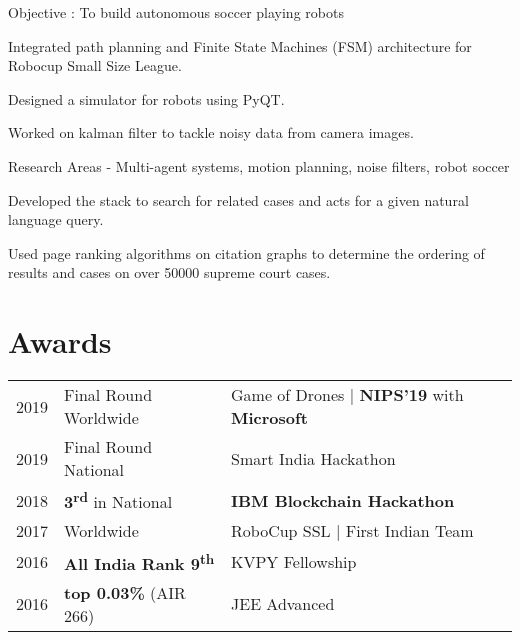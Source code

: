 \documentclass[]{deedy-resume-openfont}
\begin{document}
\begin{minipage}[t]{0.66\textwidth}
Objective : To build autonomous soccer playing robots
\begin{tightemize}
\item Integrated path planning and Finite State Machines (FSM) architecture for Robocup Small Size League.
\item Designed a simulator for robots using PyQT.
\item Worked on kalman filter to tackle noisy data from camera images.
\end{tightemize}
Research Areas - Multi-agent systems, motion planning, noise filters, robot soccer
\sectionsep

\begin{tightemize}
\item Developed the stack to search for related cases and acts for a given natural language query.
\item Used page ranking algorithms on citation graphs to determine the ordering of results
and cases on over 50000 supreme court cases.
\end{tightemize}
\sectionsep


\section{Awards} 
\begin{tabular}{rll}
2019	     & Final Round Worldwide  & Game of Drones | \textbf{NIPS'19} with \textbf{Microsoft}\\
2019	     & Final Round National  & Smart India Hackathon\\
2018	     & \textbf{3\textsuperscript{rd}} in National  & \textbf{IBM Blockchain Hackathon}\\
2017     & Worldwide & RoboCup SSL | First Indian Team  \\
2016     & \textbf{All India Rank 9\textsuperscript{th}}  & KVPY Fellowship\\
2016     & \textbf{top 0.03\%} (AIR 266)  & JEE Advanced \\
\end{tabular}
\sectionsep

\end{minipage} 
\end{document}
